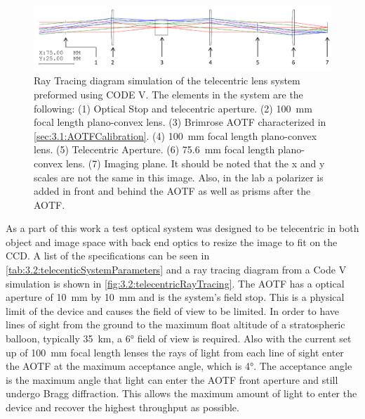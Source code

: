 \begin{figure}[h!]
    \includegraphics[width=1.0\textwidth]{./Images/3-2-TelecentricRayTracing.pdf}
    \caption[ALI Telecentric Design Prototype]{Ray Tracing diagram simulation of the telecentric lens system preformed using CODE V. The elements in the system are the following: (1) Optical Stop and telecentric aperture. (2) 100~mm focal length plano-convex lens. (3) Brimrose AOTF characterized in \autoref{sec:3.1:AOTFCalibration}. (4) 100~mm focal length plano-convex lens. (5) Telecentric Aperture. (6) 75.6~mm focal length plano-convex lens. (7) Imaging plane. It should be noted that the x and y scales are not the same in this image. Also, in the lab a polarizer is added in front and behind the AOTF as well as prisms after the AOTF.}
    \label{fig:3.2:telecentricRayTracing}
\end{figure}

As a part of this work a test optical system was designed to be telecentric in both object and image space with back end optics to resize the image to fit on the CCD. A list of the specifications can be seen in \autoref{tab:3.2:telecenticSystemParameters} and a ray tracing diagram from a Code V simulation is shown in \autoref{fig:3.2:telecentricRayTracing}. The AOTF has a optical aperture of 10~mm by 10~mm and is the system's field stop. This is a physical limit of the device and causes the field of view to be limited. In order to have lines of sight from the ground to the maximum float altitude of a stratospheric balloon, typically 35~km, a 6\si{\degree} field of view is required. Also with the current set up of 100~mm focal length lenses the rays of light from each line of sight enter the AOTF at the maximum acceptance angle, which is 4\si{\degree}. The acceptance angle is the maximum angle that light can enter the AOTF front aperture and still undergo Bragg diffraction. This allows the maximum amount of light to enter the device and recover the highest throughput as possible.


